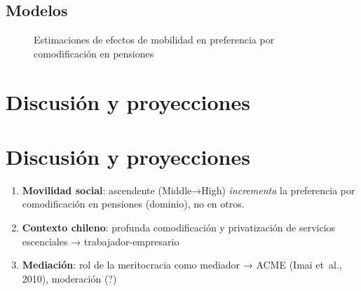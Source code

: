 \documentclass[
  spanish,
  letterpaper,
  DIV=11,
  numbers=noendperiod,
  oneside]{scrartcl}
\providecommand{\tightlist}{%
  \setlength{\itemsep}{0pt}\setlength{\parskip}{0pt}}
\begin{document}
\subsection{Modelos}\label{modelos-2}

\begin{figure}

\caption{\label{fig-mp}Estimaciones de efectos de mobilidad en
preferencia por comodificación en pensiones}


\end{figure}%

\section{Discusión y proyecciones}\label{discusiuxf3n-y-proyecciones}

\section{Discusión y proyecciones}\label{discusiuxf3n-y-proyecciones-1}

\begin{enumerate}
\def\labelenumi{\arabic{enumi}.}
\tightlist
\item
  \textbf{Movilidad social}: ascendente (Middle→High) \emph{incrementa}
  la preferencia por comodificación en pensiones (dominio), no en otros.
\item
  \textbf{Contexto chileno}: profunda comodificación y privatización de
  servicios escenciales → trabajador-empresario
\item
  \textbf{Mediación}: rol de la meritocracia como mediador → ACME (Imai
  et~al., 2010), moderación (?)
\end{enumerate}
\end{document}
